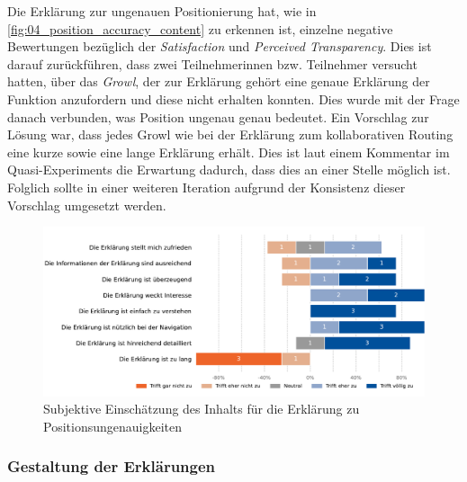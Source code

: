 
\bigskip

Die Erklärung zur ungenauen Positionierung hat, wie in \autoref{fig:04_position_accuracy_content} zu erkennen ist, einzelne negative Bewertungen bezüglich der \textit{Satisfaction} und \textit{Perceived Transparency}. Dies ist darauf zurückführen, dass zwei Teilnehmerinnen bzw. Teilnehmer versucht hatten, über das \textit{Growl}, der zur Erklärung gehört eine genaue Erklärung der Funktion anzufordern und diese nicht erhalten konnten. Dies wurde mit der Frage danach verbunden, was \glqq Position ungenau\grqq{} genau bedeutet. Ein Vorschlag zur Lösung war, dass jedes \glqq Growl\grqq{} wie bei der Erklärung zum kollaborativen Routing eine kurze sowie eine lange Erklärung erhält. Dies ist laut einem Kommentar im Quasi-Experiments die Erwartung dadurch, dass dies an einer Stelle möglich ist. Folglich sollte in einer weiteren Iteration aufgrund der Konsistenz dieser Vorschlag umgesetzt werden.

\begin{figure}[b!]
    \centering
    \includegraphics[width=\textwidth]{contents/06_model_evaluation/02_evaluation/res/qualitativeFeedback-04_position_accuracy_content.pdf}
    \caption{Subjektive Einschätzung des Inhalts für die Erklärung zu Positionsungenauigkeiten}
    \label{fig:04_position_accuracy_content}
\end{figure}

\subsubsection{Gestaltung der Erklärungen}

